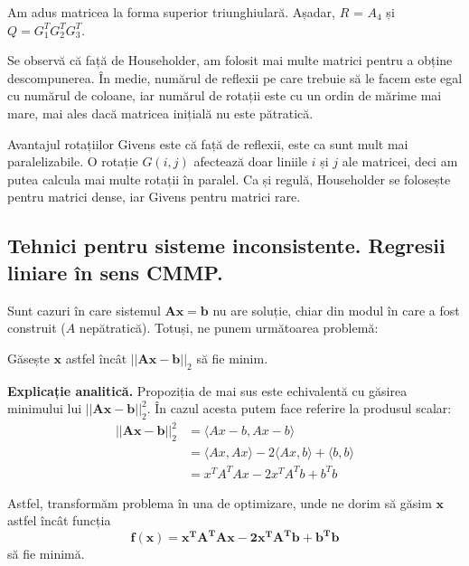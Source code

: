 \documentclass{exam}
\begin{document}
\par Am adus matricea la forma superior triunghiulară. Așadar, $R$ = $A_4$ și $Q = G_1^T G_2^T G_3^T$.

\par Se observă că față de Householder, am folosit mai multe matrici pentru a
obține descompunerea. În medie, numărul de reflexii pe care trebuie să le facem
este egal cu numărul de coloane, iar numărul de rotații este cu un ordin de
mărime mai mare, mai ales dacă matricea inițială nu este pătratică.

\par Avantajul rotațiilor Givens este că față de reflexii, este ca sunt mult mai
paralelizabile. O rotație $G(i, j)$ afectează doar liniile $i$ și $j$ ale
matricei, deci am putea calcula mai multe rotații în paralel. Ca și regulă,
Householder se folosește pentru matrici dense, iar Givens pentru matrici
rare.

\subsection{Tehnici pentru sisteme inconsistente. Regresii liniare în sens CMMP.}

Sunt cazuri în care sistemul $\mathbf{Ax} = \mathbf{b}$ nu are soluție, chiar
din modul în care a fost construit ($A$ nepătratică). Totuși, ne punem
următoarea problemă:

Găsește $\mathbf{x}$ astfel încât $||\mathbf{Ax} - \mathbf{b}||_2$ să fie minim.

\textbf{Explicație analitică.} Propoziția de mai sus este echivalentă cu găsirea
minimului lui $||\mathbf{Ax} - \mathbf{b}||_2^2$. În cazul acesta putem face
referire la produsul scalar:
\begin{align*}
	||\mathbf{Ax} - \mathbf{b}||_2^2 & = \langle Ax - b, Ax - b \rangle                                          \\
	                                 & = \langle Ax, Ax \rangle - 2 \langle Ax, b \rangle + \langle b, b \rangle \\
	                                 & = x^T A^T A x - 2 x^T A^T b + b^T b
\end{align*}

Astfel, transformăm problema în una de optimizare, unde ne dorim să
găsim $\mathbf{x}$ astfel încât funcția
\begin{equation*}
	\mathbf{f(x) = x^T A^T A x - 2 x^T A^T b + b^T b}
\end{equation*}
să fie minimă.
\end{document}
